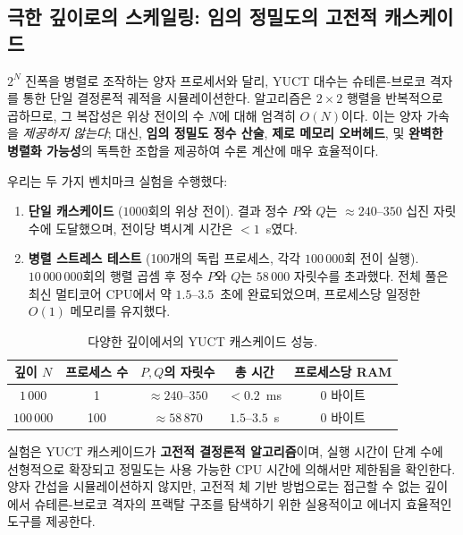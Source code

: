 \documentclass[11pt,a4paper]{article}
\begin{document}
	\subsection{극한 깊이로의 스케일링: 임의 정밀도의 고전적 캐스케이드}
	
	\(2^N\) 진폭을 병렬로 조작하는 양자 프로세서와 달리, YUCT 대수는 슈테른-브로코 격자를 통한 단일 결정론적 궤적을 시뮬레이션한다. 알고리즘은 \(2\times2\) 행렬을 반복적으로 곱하므로, 그 복잡성은 위상 전이의 수 \(N\)에 대해 엄격히 \(O(N)\)이다. 이는 양자 가속을 \emph{제공하지 않는다}; 대신, \textbf{임의 정밀도 정수 산술}, \textbf{제로 메모리 오버헤드}, 및 \textbf{완벽한 병렬화 가능성}의 독특한 조합을 제공하여 수론 계산에 매우 효율적이다.
	
	우리는 두 가지 벤치마크 실험을 수행했다:
	
	\begin{enumerate}[leftmargin=*]
		\item \textbf{단일 캐스케이드} (\(1000\)회의 위상 전이). 결과 정수 \(P\)와 \(Q\)는 \(\approx 240\)--\(350\) 십진 자릿수에 도달했으며, 전이당 벽시계 시간은 \(<1\)~\textmu s였다.
		\item \textbf{병렬 스트레스 테스트} (100개의 독립 프로세스, 각각 \(100\,000\)회 전이 실행). \(10\,000\,000\)회의 행렬 곱셈 후 정수 \(P\)와 \(Q\)는 \(58\,000\) 자릿수를 초과했다. 전체 풀은 최신 멀티코어 CPU에서 약 \(1.5\)--\(3.5\)~초에 완료되었으며, 프로세스당 일정한 \(O(1)\) 메모리를 유지했다.
	\end{enumerate}
	
	\begin{table}[htbp]
		\centering
		\caption{다양한 깊이에서의 YUCT 캐스케이드 성능.}
		\label{tab:cascade-bench}
		\begin{tabular}{c c c c c}
			\toprule
			깊이 \(N\) & 프로세스 수 & \(P,Q\)의 자릿수 & 총 시간 & 프로세스당 RAM \\
			\midrule
			\(1\,000\)   & 1   & \(\approx 240\)--\(350\) & \(< 0.2\)\ ms & 0 바이트 \\
			\(100\,000\) & 100 & \(\approx 58\,870\)     & \(1.5\)--\(3.5\)\ s & 0 바이트 \\
			\bottomrule
		\end{tabular}
	\end{table}
	
	실험은 YUCT 캐스케이드가 \textbf{고전적 결정론적 알고리즘}이며, 실행 시간이 단계 수에 선형적으로 확장되고 정밀도는 사용 가능한 CPU 시간에 의해서만 제한됨을 확인한다. 양자 간섭을 시뮬레이션하지 않지만, 고전적 체 기반 방법으로는 접근할 수 없는 깊이에서 슈테른-브로코 격자의 프랙탈 구조를 탐색하기 위한 실용적이고 에너지 효율적인 도구를 제공한다.
	
\end{document}
